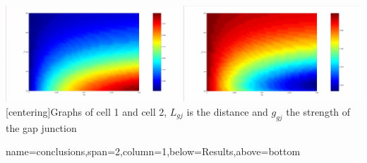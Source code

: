\documentclass[a0paper,portrait]{baposter}
\begin{document}
\begin{poster}
{\begin{center}
	\includegraphics[width=\linewidth]{cell1_2.jpg}
		[centering]{Graphs of cell 1 and cell 2, $L_{gj}$ is the distance and $g_{gj}$ the strength of the gap junction}
\end{center}

}

{name=conclusions,span=2,column=1,below=Results,above=bottom}{



}

\end{poster}
\end{document}

